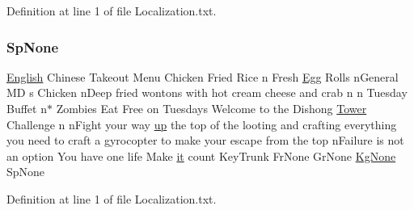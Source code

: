 Definition at line 1 of file Localization.\+txt.

\mbox{\label{_dishong_01_tower_01_challenge_2_config_2_localization_8txt_a930563c0fe6b185de309592c402a9c60}} 
\subsubsection{\texorpdfstring{SpNone}{SpNone}}
{\footnotesize\ttfamily \mbox{\hyperlink{_sphere_i_i_01_winter_01_project_2_config_2_localization_8txt_ad896b63205779b1b09e86d941ce13976}{English}} Chinese Takeout Menu Chicken Fried Rice n Fresh \mbox{\hyperlink{_sphere_i_i_01_winter_01_project_2_config_2_localization_8txt_a55334ab0b48a68a93004334728020f15}{Egg}} Rolls n\+General MD s Chicken n\+Deep fried wontons with hot cream cheese and crab n n Tuesday Buffet n$\ast$ Zombies Eat Free on Tuesdays Welcome to the Dishong \mbox{\hyperlink{_dishong_01_tower_01_challenge_2_config_2_localization_8txt_ad03a7286db82f171f8e82a1eaf4e3eaf}{Tower}} Challenge n n\+Fight your way \mbox{\hyperlink{_the_01_restless_01_curse_2_config_2_localization_01-_01_quest_8txt_a2f8d5a9cc6c08e259de10d34d28f85c4}{up}} the top of the looting and crafting everything you need to craft a gyrocopter to make your escape from the top n\+Failure is not an option You have one life Make \mbox{\hyperlink{_the_01_restless_01_curse_2_config_2_localization_01-_01_quest_8txt_a741b285909bea4855b886664c2dcd50c}{it}} count Key\+Trunk Fr\+None Gr\+None \mbox{\hyperlink{_the_01_restless_01_curse_2_config_2_localization_8txt_acc1c43e0980c5828bcfaf85313744919}{Kg\+None}} Sp\+None}



Definition at line 1 of file Localization.\+txt.

\mbox{\label{_dishong_01_tower_01_challenge_2_config_2_localization_8txt_a57c8a1939d85714b9d31af42de2479b4}} 
